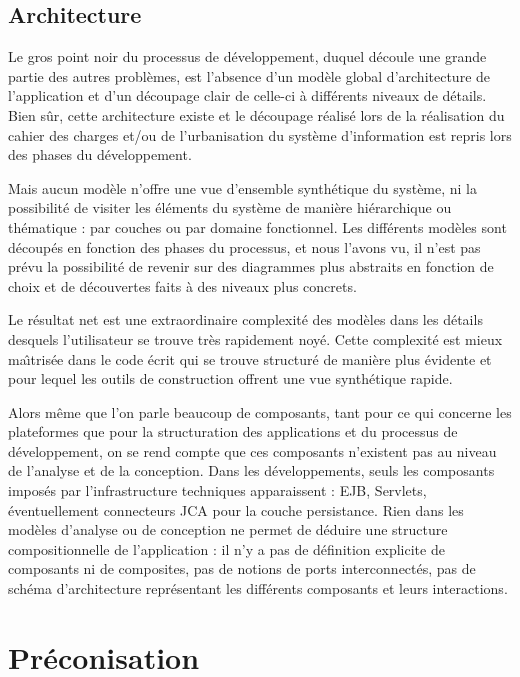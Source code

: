 \subsection{Architecture}

Le gros point noir du processus de d\'eveloppement, duquel
d\'ecoule une grande partie des autres probl\`emes, est l'absence
d'un mod\`ele global d'architecture de l'application et d'un
d\'ecoupage clair de celle-ci \`a diff\'erents niveaux de
d\'etails. Bien s\^ur, cette architecture existe et le d\'ecoupage
r\'ealis\'e lors de la r\'ealisation du cahier des charges et/ou de
l'urbanisation du syst\`eme d'information est repris lors des phases
du d\'eveloppement. 

Mais aucun mod\`ele n'offre une vue d'ensemble synth\'etique du
syst\`eme, ni la possibilit\'e de visiter les \'el\'ements du
syst\`eme de mani\`ere hi\'erarchique ou th\'ematique : par
couches ou par domaine fonctionnel. Les diff\'erents mod\`eles sont d\'ecoup\'es en fonction des
phases du processus, et nous l'avons vu, il n'est pas pr\'evu la
possibilit\'e de revenir sur des diagrammes plus abstraits en
fonction de choix et de d\'ecouvertes faits \`a des niveaux plus
concrets.

Le r\'esultat net est une extraordinaire complexit\'e des mod\`eles
dans les d\'etails desquels l'utilisateur se trouve tr\`es
rapidement noy\'e. Cette complexit\'e est mieux ma\^{\i}tris\'ee dans
le code \'ecrit qui se trouve structur\'e de mani\`ere plus
\'evidente et pour lequel les outils de construction offrent une vue
synth\'etique rapide.

Alors m\^eme que l'on parle beaucoup de composants, tant pour ce qui
concerne les plateformes que pour la structuration des applications et
du processus de d\'eveloppement, on se rend compte que ces composants
n'existent pas au niveau de l'analyse et de la conception. Dans les
d\'eveloppements, seuls les composants impos\'es par
l'infrastructure techniques apparaissent : \textsf{EJB},
\textsf{Servlets}, \'eventuellement connecteurs
\textsf{JCA} pour la couche persistance. Rien dans les
mod\`eles d'analyse ou de conception ne permet de d\'eduire une
structure compositionnelle de l'application : il n'y a pas de
d\'efinition explicite de composants ni de composites, pas de
notions de ports interconnect\'es, pas de sch\'ema d'architecture
repr\'esentant les diff\'erents composants et leurs interactions.

\section{Pr\'econisation}

